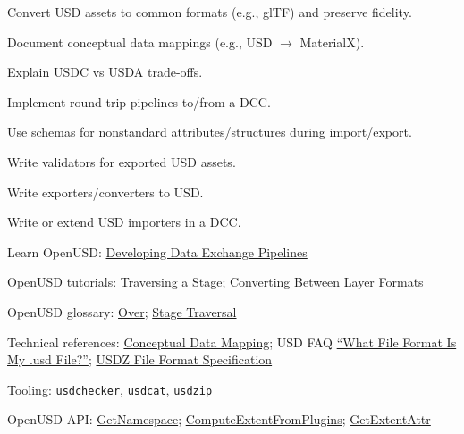 
\begin{Objectives}
  \item Convert USD assets to common formats (e.g., glTF) and preserve fidelity.
  \item Document conceptual data mappings (e.g., USD $\rightarrow$ MaterialX).
  \item Explain USDC vs USDA trade-offs.
  \item Implement round-trip pipelines to/from a DCC.
  \item Use schemas for nonstandard attributes/structures during import/export.
  \item Write validators for exported USD assets.
  \item Write exporters/converters to USD.
  \item Write or extend USD importers in a DCC.
\end{Objectives}

\begin{Resources}
  \item Learn OpenUSD: \href{https://docs.nvidia.com/learn-openusd/latest/data-exchange/index.html}{Developing Data Exchange Pipelines}
  \item OpenUSD tutorials: \href{https://openusd.org/release/tut_traversing_stage.html}{Traversing a Stage}; \href{https://openusd.org/release/tut_converting_between_layer_formats.html}{Converting Between Layer Formats}
  \item OpenUSD glossary: \href{https://openusd.org/release/glossary.html#usdglossary-over}{Over}; \href{https://openusd.org/release/glossary.html#stage-traversal}{Stage Traversal}
  \item Technical references: \href{https://docs.omniverse.nvidia.com/usd/latest/technical_reference/conceptual_data_mapping/index.html}{Conceptual Data Mapping}; USD FAQ \href{https://openusd.org/release/usdfaq.html#what-file-format-is-my-usd-file}{``What File Format Is My .usd File?''}; \href{https://openusd.org/release/spec_usdz.html}{USDZ File Format Specification}
  \item Tooling: \href{https://openusd.org/release/toolset.html#usdchecker}{\texttt{usdchecker}}, \href{https://openusd.org/release/toolset.html#usdcat}{\texttt{usdcat}}, \href{https://openusd.org/release/toolset.html#usdzip}{\texttt{usdzip}}
  \item OpenUSD API: \href{https://openusd.org/release/api/class_usd_property.html}{GetNamespace}; \href{https://openusd.org/release/api/class_usd_geom_boundable.html}{ComputeExtentFromPlugins}; \href{https://openusd.org/release/api/class_usd_geom_boundable.html}{GetExtentAttr}
\end{Resources}

